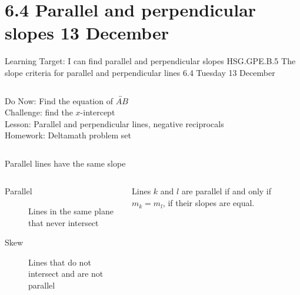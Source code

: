 \section{6.4 Parallel and perpendicular slopes \hfill 13 December \,}
\begin{frame}{Learning Target: I can find parallel and perpendicular slopes}
  {HSG.GPE.B.5 The slope criteria for parallel and perpendicular lines \hfill \alert{6.4 Tuesday 13 December}}
  \begin{columns}
      Do Now: Find the equation of $\overleftrightarrow{AB}$ \\
      Challenge: find the $x$-intercept \\[1cm]
      Lesson: Parallel and perpendicular lines, negative reciprocals \\
      Homework: Deltamath problem set
    \begin{flushright}
    \end{flushright}
  \end{columns}
\end{frame}

\begin{frame}{Parallel lines have the same slope}
  \begin{columns}
    \begin{description}
      \item[Parallel] Lines in the same plane that never intersect
      \item[Skew] Lines that do not intersect and are not parallel
    \end{description} \bigskip
    Lines $k$ and $l$ are parallel if and only if $m_k=m_l$, if their slopes are equal.
    \begin{flushright}
    \end{flushright}
  \end{columns}
\end{frame}

